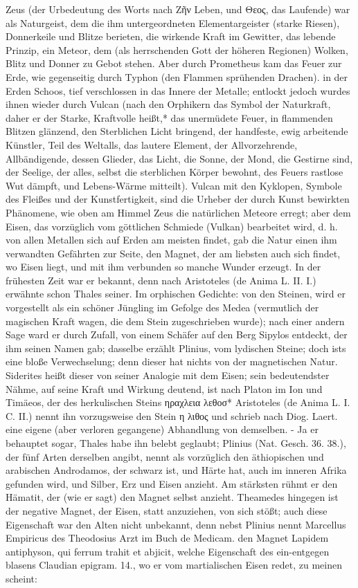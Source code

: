 \documentclass[a4paper, 11pt, oneside, polutonikogreek, german]{article}
\begin{document}
Zeus (der Urbedeutung des Worts nach Ζῆν Leben, und Θεος, das Laufende) war als Naturgeist, dem die ihm untergeordneten Elementargeister (starke Riesen), Donnerkeile und Blitze berieten, die wirkende Kraft im Gewitter, das lebende Prinzip, ein Meteor, dem (als herrschenden Gott der höheren Regionen) Wolken, Blitz und Donner zu Gebot stehen. Aber durch Prometheus kam das Feuer zur Erde, wie gegenseitig durch Typhon (den Flammen sprühenden Drachen). in der Erden Schoos, tief verschlossen in das Innere der Metalle; entlockt jedoch wurdes ihnen wieder durch Vulcan (nach den Orphikern das Symbol der Naturkraft, daher er der Starke, Kraftvolle heißt,* das unermüdete Feuer, in flammenden Blitzen glänzend, den Sterblichen Licht bringend, der handfeste, ewig arbeitende Künstler, Teil des Weltalls, das lautere Element, der Allvorzehrende, Allbändigende, dessen Glieder, das Licht, die Sonne, der Mond, die Gestirne sind, der Seelige, der alles, selbst die sterblichen Körper bewohnt, des Feuers rastlose Wut dämpft, und Lebens-Wärme mitteilt). Vulcan mit den Kyklopen, Symbole des Fleißes und der Kunstfertigkeit, sind die Urheber der durch Kunst bewirkten Phänomene, wie oben am Himmel Zeus die natürlichen Meteore erregt; aber dem Eisen, das vorzüglich vom göttlichen Schmiede (Vulkan) bearbeitet wird, d. h. von allen Metallen sich auf Erden am meisten findet, gab die Natur einen ihm verwandten Gefährten zur Seite, den Magnet, der am liebsten auch sich findet, wo Eisen liegt, und mit ihm verbunden so manche Wunder erzeugt. In der frühesten Zeit war er bekannt, denn nach Aristoteles (de Anima L. II. I.) erwähnte schon Thales seiner. Im orphischen Gedichte: von den Steinen, wird er vorgestellt als ein schöner Jüngling im Gefolge des Medea (vermutlich der magischen Kraft wagen, die dem Stein zugeschrieben wurde); nach einer andern Sage ward er durch Zufall, von einem Schäfer auf den Berg Sipylos entdeckt, der ihm seinen Namen gab; dasselbe erzählt Plinius, vom lydischen Steine; doch ists eine bloße Verwechselung; denn dieser hat nichts von der magnetischen Natur. Siderites heißt dieser von seiner Analogie mit dem Eisen; sein bedeutendster Nähme, auf seine Kraft und Wirkung deutend, ist nach Platon im Ion und Timäeos, der des herkulischen Steins ηραχλεια λεθοσ* Aristoteles (de Anima L. I. C. II.) nennt ihn vorzugsweise den Stein η λιθος und schrieb nach Diog. Laert. eine eigene (aber verloren gegangene) Abhandlung von demselben. - Ja er behauptet sogar, Thales habe ihn belebt geglaubt; Plinius (Nat. Gesch. 36. 38.), der fünf Arten derselben angibt, nennt als vorzüglich den äthiopischen und arabischen Androdamos, der schwarz ist, und Härte hat, auch im inneren Afrika gefunden wird, und Silber, Erz und Eisen anzieht. Am stärksten rühmt er den Hämatit, der (wie er sagt) den Magnet selbst anzieht. Theamedes hingegen ist der negative Magnet, der Eisen, statt anzuziehen, von sich stößt; auch diese Eigenschaft war den Alten nicht unbekannt, denn nebst Plinius nennt Marcellus Empiricus des Theodosius Arzt im Buch de Medicam. den Magnet Lapidem antiphyson, qui ferrum trahit et abjicit, welche Eigenschaft des ein-entgegen blasens Claudian epigram. 14., wo er vom martialischen Eisen redet, zu meinen scheint:
\end{document}
